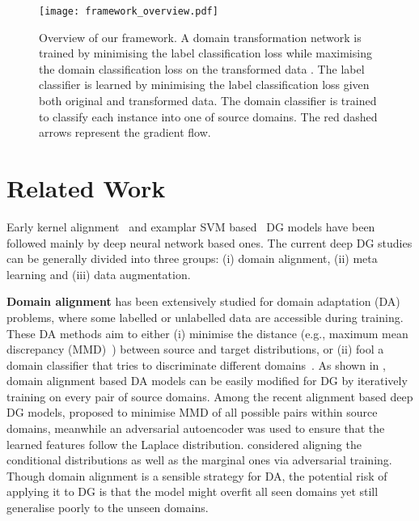 \documentclass[letterpaper]{article}
\newcommand{\keypoint}[1]{\vspace{0.1cm}\noindent\textbf{#1}}
\begin{document}
\begin{figure*}[ht]
\centering
\texttt{[image: framework\_overview.pdf]}
\caption{\small Overview of our framework. A domain transformation network  is trained by minimising the label classification loss  while maximising the domain classification loss  on the transformed data . The label classifier  is learned by minimising the label classification loss given both original and transformed data. The domain classifier  is trained to classify each instance into one of source domains. The red dashed arrows represent the gradient flow.}
\label{fig:framework_overview}
\vspace{-0.2cm}
\end{figure*}



\section{Related Work} \label{sec:related_work}
Early kernel alignment~\cite{muandet2013domain,gan2016learning} and examplar SVM based~\cite{xu2014exploiting,niu2015multiview} DG models have been followed mainly by deep neural network based ones. The current deep DG studies can be generally divided into three groups: (i) domain alignment, (ii) meta learning and (iii) data augmentation.

\keypoint{Domain alignment} has been extensively studied for domain adaptation (DA) problems, where some labelled or unlabelled data are accessible during training. These DA methods aim to either (i) minimise the distance (e.g., maximum mean discrepancy (MMD)~\cite{pan2008transfer}) between source and target distributions, or (ii) fool a domain classifier that tries to discriminate different domains~\cite{ganin2015unsupervised}. As shown in \cite{motiian2017unified}, domain alignment based DA models can be easily modified for DG by iteratively training on every pair of source domains. Among the recent alignment based deep DG models, \cite{li2018mmdaae} proposed to minimise MMD of all possible pairs within source domains, meanwhile an adversarial autoencoder was used to ensure that the learned features follow the Laplace distribution. \cite{li2018ciddg} considered aligning the conditional distributions as well as the marginal ones via adversarial training.
Though domain alignment is a sensible strategy for DA, the potential risk of applying it to DG is that the model might overfit all seen domains yet still generalise poorly to the unseen domains.
\end{document}
